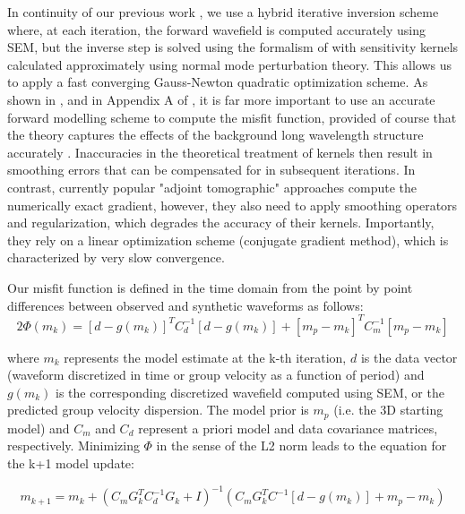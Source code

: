 \documentclass[12pt]{article}
\begin{document}
In continuity of our previous work \citep[e.g][]{marone2007three,yuan20113,yuan2014lithospheric}, we use a hybrid iterative inversion scheme where, at each iteration, the forward wavefield is computed accurately using SEM, but the inverse step is solved using the formalism of \cite{tarantola1982generalized} with sensitivity kernels calculated approximately using normal mode perturbation theory. 
This allows us to apply a fast converging Gauss-Newton quadratic optimization scheme. 
As shown in \cite{tarantola2005inverse}, and in Appendix A of \cite{lekic2011inferring}, it is far more important to use an accurate forward modelling scheme to compute the misfit function, provided of course that the theory captures the effects of the background long wavelength structure accurately \citep[unlike the examples shown in][]{valentine2016impact}.
Inaccuracies in the theoretical treatment of kernels then result in smoothing errors that can be compensated for in subsequent iterations. In contrast, currently popular "adjoint tomographic" approaches \citep{zhu2015seismic,bozdag2016global} compute the numerically exact gradient, however, they also need to apply smoothing operators and regularization, which degrades the accuracy of their kernels. Importantly, they rely on a linear optimization scheme (conjugate gradient method), which is characterized by very slow convergence.

Our misfit function is defined in the time domain from the point by point differences between observed and synthetic waveforms as follows:
\begin{equation}
2\Phi(m_{k}) = [d - g(m_{k})]^{T} C^{-1}_{d} [d-g(m_{k})] + [m_{p}-m_{k}]^{T} C_{m}^{-1} [m_{p}-m_{k}]
\end{equation}

\noindent where $m_{k}$ represents the model estimate at the k-th iteration, $d$ is the data vector (waveform discretized in time or group velocity as a function of period) and $g(m_k)$ is the corresponding discretized wavefield computed using SEM, or the predicted group velocity dispersion. The model prior is $m_p$  (i.e. the 3D starting model) and $C_m$ and $C_d$ represent a priori model and data covariance matrices, respectively. Minimizing $\Phi$ in the sense of the L2 norm leads to the equation for the k+1 model update:

\begin{equation}
m_{k+1} = m_{k} + (C_{m}G^{T}_{k}C^{-1}_{d}G_{k} + I)^{-1} (C_{m}G_{k}^{T}C^{-1}[d-g(m_{k})]+ m_{p}-m_{k})
\end{equation}
\end{document}
